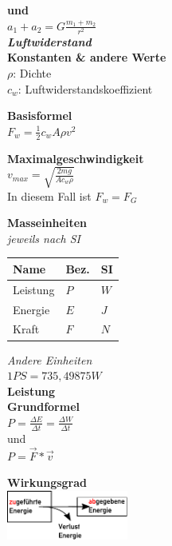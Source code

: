 \documentclass[a4paper,9pt]{article}
\begin{document}
\begin{multicols}{4}
\textbf{und}\\
	\(a_1 + a_2 = G\frac{m_1 + m_2}{r^2}\)\\
	

\textbf{\textit{Luftwiderstand}}\\
	

\textbf{Konstanten \& andere Werte}\\
	\(\rho\): Dichte\\
	\(c_w\): Luftwiderstandskoeffizient
	

\textbf{Basisformel}\\
	\( F_w = \frac{1}{2} c_w A  \rho v^2 \)
	

\textbf{Maximalgeschwindigkeit}\\
	\(v_{max} = \sqrt{\frac{2mg}{Ac_w\rho}} \)\\
	In diesem Fall ist \(F_w = F_G\)
	
	

\textbf{Masseinheiten}\\
	\textit{jeweils nach SI}\\
	\begin{tabular}{|l|l|l|}
		\hline
		

\textbf{Name} & 

\textbf{Bez.} & 

\textbf{SI} \\\hline
		Leistung & \(P\) & \(W\)\\\hline
		Energie & \(E\) & \(J\) \\\hline
		Kraft & \(F\) & \(N\)\\\hline
	\end{tabular}
	
	\textit{Andere Einheiten}\\
	\(1 PS = 735,49875 W\)\\
	
	
	

\textbf{Leistung}\\
	

\textbf{Grundformel}\\
	\(P = \frac{\Delta E}{\Delta t} = \frac{\Delta W}{\Delta t} \)\\
	und\\
	\(P = \vec{F} * \vec{v}\)
	
	

\textbf{Wirkungsgrad}\\
	\includegraphics[width=4cm]{wirkungsgrad}\\
	


\end{multicols}
\end{document}

